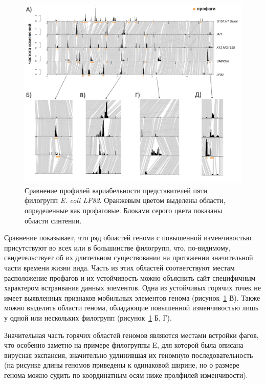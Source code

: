 \begin{figure}[!ht] 
    \center
      \includegraphics[width=\textwidth]{Dissertation/images/complexity/coli_phylogroups_complexity_3.png}
    \caption{Сравнение профилей вариабельности представителей пяти филогрупп \textit{E. coli LF82}. Оранжевым цветом выделены области, определенные как профаговые. Блоками серого цвета показаны области синтении.}
    \label{img:phylogroups_complex} 
  \end{figure}
  

Сравнение показывает, что ряд областей генома с повышенной изменчивостью присутствуют во всех или в большинстве филогрупп, что, по-видимому, свидетельствует об их длительном существовании на протяжении значительной части времени жизни вида. Часть из этих областей соответствуют местам расположение профагов и их устойчивость можно объяснить сайт специфичным характером встраивания данных элементов. Одна из устойчивых горячих точек не имеет выявленных признаков мобильных элементов генома (рисунок~\ref{img:phylogroups_complex} В). Также можно выделить области генома, обладающие повышенной изменчивостью лишь у одной или нескольких филогрупп (рисунок~\ref{img:phylogroups_complex} Б, Г).

Значительная часть горячих областей геномов являются местами встройки фагов, что особенно заметно на примере филогруппы E, для которой была описана вирусная экспансия, значительно удлинившая их геномную последовательность (на рисунке длины геномов приведены к одинаковой ширине, но о размере генома можно судить по координатным осям ниже пролфилей изменчивости).

